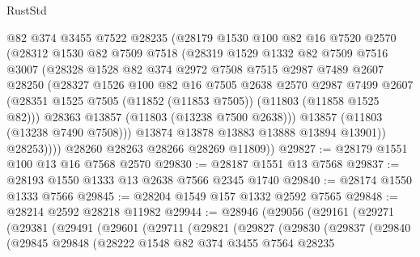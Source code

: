 \begin{lexlean}{RustStd}
\begin{coremodule}
              @82
              @374
              @3455
              @7522
              @28235
              (@28179
                @1530
                @100
                @82
                @16
                @7520
                @2570
                (@28312
                  @1530
                  @82
                  @7509
                  @7518
                  (@28319
                    @1529
                    @1332
                    @82
                    @7509
                    @7516
                    @3007
                    (@28328
                      @1528
                      @82
                      @374
                      @2972
                      @7508
                      @7515
                      @2987
                      @7489
                      @2607
                      @28250
                      (@28327
                        @1526
                        @100
                        @82
                        @16
                        @7505
                        @2638
                        @2570
                        @2987
                        @7499
                        @2607
                        (@28351 @1525 @7505 (@11852 (@11853 @7505)) (@11803 (@11858 @1525 @82)))
                        @28363
                        @13857
                        (@11803 (@13238 @7500 @2638)))
                      @13857
                      (@11803 (@13238 @7490 @7508)))
                    @13874
                    @13878
                    @13883
                    @13888
                    @13894
                    @13901))
                @28253))))
        @28260
        @28263
        @28266
        @28269
        @11809))
@29827 := @28179 @1551 @100 @13 @16 @7568 @2570
@29830 := @28187 @1551 @13 @7568
@29837 := @28193 @1550 @1333 @13 @2638 @7566 @2345 @1740
@29840 := @28174 @1550 @1333 @7566
@29845 := @28204 @1549 @157 @1332 @2592 @7565
@29848 := @28214 @2592 @28218 @11982
@29944 := @28946
    (@29056
      (@29161
        (@29271
          (@29381
            (@29491
              (@29601
                (@29711
                  (@29821
                    (@29827
                      (@29830
                        (@29837
                          (@29840
                            (@29845
                              @29848
                              (@28222
                                @1548
                                @82
                                @374
                                @3455
                                @7564
                                @28235

\end{coremodule}
\end{lexlean}

